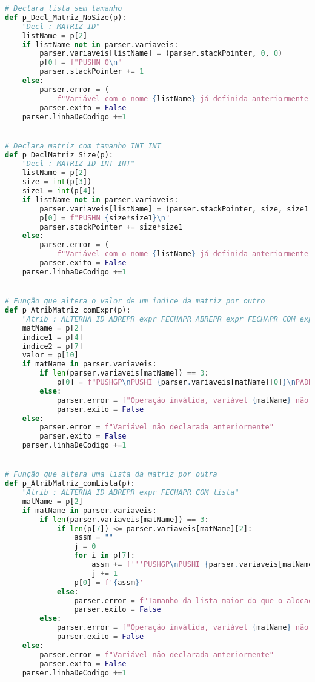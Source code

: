 \documentclass[11pt,a4paper]{report}%
\begin{document}
\begin{scriptsize}
\begin{lstlisting}[language=python]
# Declara lista sem tamanho
def p_Decl_Matriz_NoSize(p):
    "Decl : MATRIZ ID"
    listName = p[2]
    if listName not in parser.variaveis:
        parser.variaveis[listName] = (parser.stackPointer, 0, 0)
        p[0] = f"PUSHN 0\n"
        parser.stackPointer += 1
    else:
        parser.error = (
            f"Variável com o nome {listName} já definida anteriormente.")
        parser.exito = False
    parser.linhaDeCodigo +=1


# Declara matriz com tamanho INT INT
def p_DeclMatriz_Size(p):
    "Decl : MATRIZ ID INT INT"
    listName = p[2]
    size = int(p[3])
    size1 = int(p[4])
    if listName not in parser.variaveis:
        parser.variaveis[listName] = (parser.stackPointer, size, size1)
        p[0] = f"PUSHN {size*size1}\n"
        parser.stackPointer += size*size1
    else:
        parser.error = (
            f"Variável com o nome {listName} já definida anteriormente.")
        parser.exito = False
    parser.linhaDeCodigo +=1


# Função que altera o valor de um indice da matriz por outro
def p_AtribMatriz_comExpr(p):
    "Atrib : ALTERNA ID ABREPR expr FECHAPR ABREPR expr FECHAPR COM expr"
    matName = p[2]
    indice1 = p[4]
    indice2 = p[7]
    valor = p[10]
    if matName in parser.variaveis:
        if len(parser.variaveis[matName]) == 3:
            p[0] = f"PUSHGP\nPUSHI {parser.variaveis[matName][0]}\nPADD\n{indice1}PUSHI {parser.variaveis[matName][2]}\nMUL\nPADD\n{indice2}{valor}STOREN\n"
        else:
            parser.error = f"Operação inválida, variável {matName} não é uma matriz"
            parser.exito = False
    else:
        parser.error = f"Variável não declarada anteriormente"
        parser.exito = False
    parser.linhaDeCodigo +=1


# Função que altera uma lista da matriz por outra
def p_AtribMatriz_comLista(p):
    "Atrib : ALTERNA ID ABREPR expr FECHAPR COM lista"
    matName = p[2]
    if matName in parser.variaveis:
        if len(parser.variaveis[matName]) == 3:
            if len(p[7]) <= parser.variaveis[matName][2]:
                assm = ""
                j = 0
                for i in p[7]:
                    assm += f'''PUSHGP\nPUSHI {parser.variaveis[matName][0]}\nPADD\n{p[4]}PUSHI {parser.variaveis[matName][2]}\nMUL\nPADD\nPUSHI {j}\nPUSHI {i}\nSTOREN\n'''
                    j += 1
                p[0] = f'{assm}'
            else:
                parser.error = f"Tamanho da lista maior do que o alocado"
                parser.exito = False
        else:
            parser.error = f"Operação inválida, variável {matName} não é uma matriz"
            parser.exito = False
    else:
        parser.error = f"Variável não declarada anteriormente"
        parser.exito = False
    parser.linhaDeCodigo +=1



\end{lstlisting}
\end{scriptsize}
\end{document}
